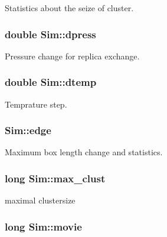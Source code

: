 Statistics about the seize of cluster. 

\hypertarget{class_sim_a3932d35b63dc24ad4f11c902e2245c16}{
\subsubsection[{dpress}]{\setlength{\rightskip}{0pt plus 5cm}double Sim\+::dpress}}\label{class_sim_a3932d35b63dc24ad4f11c902e2245c16}


Pressure change for replica exchange. 

\hypertarget{class_sim_a7eeac7dc978008dbcb58db25672d3e4d}{
\subsubsection[{dtemp}]{\setlength{\rightskip}{0pt plus 5cm}double Sim\+::dtemp}}\label{class_sim_a7eeac7dc978008dbcb58db25672d3e4d}


Temprature step. 

\hypertarget{class_sim_a1880ddedceb3460fd343d0f847032fdf}{
\subsubsection[{edge}]{ Sim\+::edge}}\label{class_sim_a1880ddedceb3460fd343d0f847032fdf}


Maximum box length change and statistics. 

\hypertarget{class_sim_a61199ec6703bab63f3936d888b53ad26}{
\subsubsection[{max\+\_\+clust}]{\setlength{\rightskip}{0pt plus 5cm}long Sim\+::max\+\_\+clust}}\label{class_sim_a61199ec6703bab63f3936d888b53ad26}


maximal clustersize 

\hypertarget{class_sim_a8ab1f7bc34f48d81074283f529ee291c}{
\subsubsection[{movie}]{\setlength{\rightskip}{0pt plus 5cm}long Sim\+::movie}}\label{class_sim_a8ab1f7bc34f48d81074283f529ee291c}


